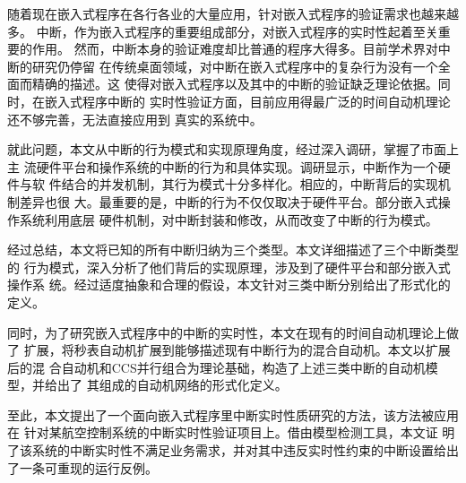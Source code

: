 \begin{cabstract}
  随着现在嵌入式程序在各行各业的大量应用，针对嵌入式程序的验证需求也越来越多。
  中断，作为嵌入式程序的重要组成部分，对嵌入式程序的实时性起着至关重要的作用。
  然而，中断本身的验证难度却比普通的程序大得多。目前学术界对中断的研究仍停留
  在传统桌面领域，对中断在嵌入式程序中的复杂行为没有一个全面而精确的描述。这
  使得对嵌入式程序以及其中的中断的验证缺乏理论依据。同时，在嵌入式程序中断的
  实时性验证方面，目前应用得最广泛的时间自动机理论还不够完善，无法直接应用到
  真实的系统中。
  
  就此问题，本文从中断的行为模式和实现原理角度，经过深入调研，掌握了市面上主
  流硬件平台和操作系统的中断的行为和具体实现。调研显示，中断作为一个硬件与软
  件结合的并发机制，其行为模式十分多样化。相应的，中断背后的实现机制差异也很
  大。最重要的是，中断的行为不仅仅取决于硬件平台。部分嵌入式操作系统利用底层
  硬件机制，对中断封装和修改，从而改变了中断的行为模式。
  
  经过总结，本文将已知的所有中断归纳为三个类型。本文详细描述了三个中断类型的
  行为模式，深入分析了他们背后的实现原理，涉及到了硬件平台和部分嵌入式操作系
  统。经过适度抽象和合理的假设，本文针对三类中断分别给出了形式化的定义。
  
  同时，为了研究嵌入式程序中的中断的实时性，本文在现有的时间自动机理论上做了
  扩展，将秒表自动机扩展到能够描述现有中断行为的混合自动机。本文以扩展后的混
  合自动机和CCS并行组合为理论基础，构造了上述三类中断的自动机模型，并给出了
  其组成的自动机网络的形式化定义。
  
  至此，本文提出了一个面向嵌入式程序里中断实时性质研究的方法，该方法被应用在
  针对某航空控制系统的中断实时性验证项目上。借由模型检测工具\uppaal ，本文证
  明了该系统的中断实时性不满足业务需求，并对其中违反实时性约束的中断设置给出
  了一条可重现的运行反例。
  
\end{cabstract}



